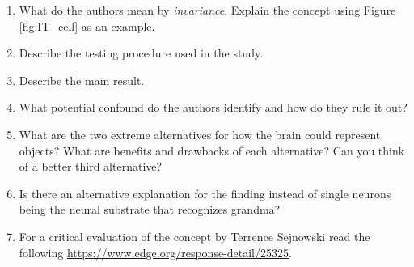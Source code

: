 \documentclass[12pt,english]{scrartcl}
\begin{document}
\begin{enumerate}
 \item What do the authors mean by \textit{invariance}. Explain the concept using Figure \ref{fig:IT_cell} as an example. 
 \item Describe the testing procedure used in the study.
 \item Describe the main result.
 \item What potential confound do the authors identify and how do they rule it out? 
 \item What are the two extreme alternatives for how the brain could represent objects? What are benefits and drawbacks of each alternative? Can you think of a better third alternative? 
\item Is there an alternative explanation for the finding instead of single neurons being the neural substrate that recognizes grandma?
 \item For a critical evaluation of the concept by Terrence Sejnowski read the following \url{https://www.edge.org/response-detail/25325}.
\end{enumerate}
\end{document}
